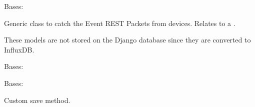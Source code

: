\documentclass[letterpaper,10pt,english]{sphinxmanual}
\begin{document}
\begin{fulllineitems}
\label{modules/microdata:microdata.models.Event}
Bases: 

Generic class to catch the Event REST Packets from devices. Relates to a {\hyperref[modules/microdata:microdata.models.Device]{\emph{}}}.

These models are not stored on the Django database since they are converted to InfluxDB.

\begin{fulllineitems}
\label{modules/microdata:microdata.models.Event.DoesNotExist}
Bases: 

\end{fulllineitems}


\begin{fulllineitems}
\label{modules/microdata:microdata.models.Event.MultipleObjectsReturned}
Bases: 

\end{fulllineitems}


\begin{fulllineitems}
\label{modules/microdata:microdata.models.Event.device}
\end{fulllineitems}


\begin{fulllineitems}
\label{modules/microdata:microdata.models.Event.objects}
\end{fulllineitems}


\begin{fulllineitems}
\label{modules/microdata:microdata.models.Event.save}
Custom save method.


\end{fulllineitems}
\end{fulllineitems}
\end{document}
